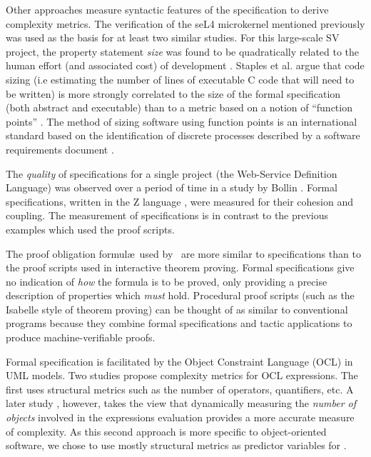 Other approaches measure syntactic features of the specification to derive complexity metrics. The verification of the seL4 microkernel mentioned previously was used as the basis for at least two similar studies. For this large-scale SV project, the property statement \textit{size} was found to be quadratically related to the human effort (and associated cost) of development \cite{CostIndicator}. Staples et al. argue that code sizing (i.e estimating the number of lines of executable C code that will need to be written) is more strongly correlated to the size of the formal specification (both abstract and executable) than to a metric based on a notion of ``function points'' \cite{Staples:2013}. The method of sizing software using function points is an international standard based on the identification of discrete processes described by a software requirements document \cite{CFP}.
   
The \textit{quality} of specifications for a single project (the Web-Service Definition Language) was observed over a period of time in a study by Bollin \cite{Zspecs}. Formal specifications, written in the Z language \cite{Zlang}, were measured for their cohesion and coupling. The measurement of specifications is in contrast to the previous examples \cite{Aspinall2016, CostIndicator} which used the proof scripts. 

The proof obligation formul\ae~used by \where~are more similar to specifications than to the proof scripts used in interactive theorem proving.
Formal specifications give no indication of \textit{how} the formula is to be proved, only providing a precise description of properties which \textit{must} hold. 
Procedural proof scripts (such as the Isabelle style of theorem proving) can be thought of as similar to conventional programs because they combine formal specifications and tactic applications to produce machine-verifiable proofs. 

     
Formal specification is facilitated by the Object Constraint Language (OCL) \cite{OCL} in UML models. 
Two studies propose complexity metrics for OCL expressions. 
The first \cite{TowardsOCL} uses structural metrics such as the number of operators, quantifiers, etc. 
A later study \cite{OCLalt}, however, takes the view that dynamically measuring the \textit{number of objects} involved in the expressions evaluation provides a more accurate measure of complexity. 
As this second approach is more specific to object-oriented software, we chose to use mostly structural metrics as predictor variables for \where. \\

